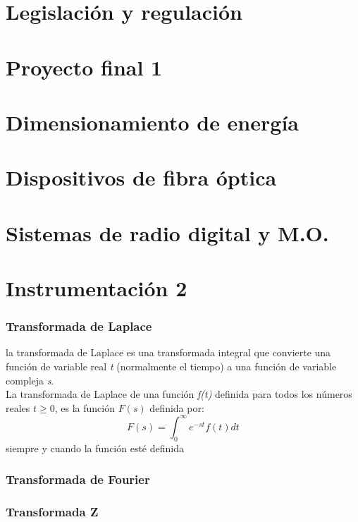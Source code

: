 \documentclass[12pt,fleqn,a4paper,oneside]{LegrandOrangeBook}
\begin{document}
\part{Legislación y regulación}

\part{Proyecto final 1}

\part{Dimensionamiento de energía}

\part{Dispositivos de fibra óptica}

\part{Sistemas de radio digital y M.O.}

\part{Instrumentación 2}
\section{Transformada de Laplace}
la transformada de Laplace es una transformada integral que convierte una función de variable real \textit{t} (normalmente el tiempo) a una función de variable compleja \textit{s}.\\
La transformada de Laplace de una función \textit{f(t)} definida para todos los números reales $t\geq 0$, es la función $F(s)$ definida por:
\begin{equation}
F(s)=\int_0^\infty e^{-st}f(t)dt
\end{equation}
siempre y cuando la función esté definida
\section{Transformada de Fourier}

\section{Transformada Z}
\end{document}
